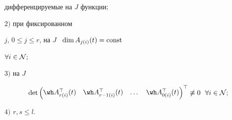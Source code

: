 \begin{thm}
дифференцируемые на $J$ функции$\/;$





\noindent{}$2)$ при фиксированном


$j$, $0\le j \le r$, на $J$ \ $\dim A_{j(i)}(t)=\operatorname{const}$


\; $\forall i \in \cal N;$





\noindent{}$3)$ на $J$


\begin{equation}


\det


\begin{pmatrix}


\wh A_{r(i)}^\top(t) & \wh A_{r-1(i)}^\top(t) & \dotsc & \wh


A_{0(i)}^\top(t)


\end{pmatrix}^\top \not \equiv 0


\ \ \forall i \in \cal N;


\end{equation}





\noindent{}$4)$ $r,s \le l$.


\end{thm}





